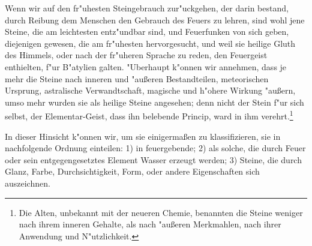 \documentclass[a4paper, 11pt, oneside, polutonikogreek, german]{article}
\begin{document}
Wenn wir auf den fr"uhesten Steingebrauch zur"uckgehen, der darin bestand, durch Reibung dem Menschen den Gebrauch des Feuers zu lehren, sind wohl jene Steine, die am leichtesten entz"undbar sind, und Feuerfunken von sich geben, diejenigen gewesen, die am fr"uhesten hervorgesucht, und weil sie heilige Gluth des Himmels, oder nach der fr"uheren Sprache zu reden, den Feuergeist enthielten, f"ur B"atylien galten. "Uberhaupt k"onnen wir annehmen, dass je mehr die Steine nach inneren und "außeren Bestandteilen, meteorischen Ursprung, astralische Verwandtschaft, magische und h"ohere Wirkung "außern, umso mehr wurden sie als heilige Steine angesehen; denn nicht der Stein f"ur sich selbst, der Elementar-Geist, dass ihn belebende Princip, ward in ihm verehrt.\footnote{Die Alten, unbekannt mit der neueren Chemie, benannten die Steine weniger nach ihrem inneren Gehalte, als nach "außeren Merkmahlen, nach ihrer Anwendung und N"utzlichkeit.}

In dieser Hinsicht k"onnen wir, um sie einigermaßen zu klassifizieren, sie in nachfolgende Ordnung einteilen: 1) in feuergebende; 2) als solche, die durch Feuer oder sein entgegengesetztes Element Wasser erzeugt werden; 3) Steine, die durch Glanz, Farbe, Durchsichtigkeit, Form, oder andere Eigenschaften sich auszeichnen.
\end{document}
